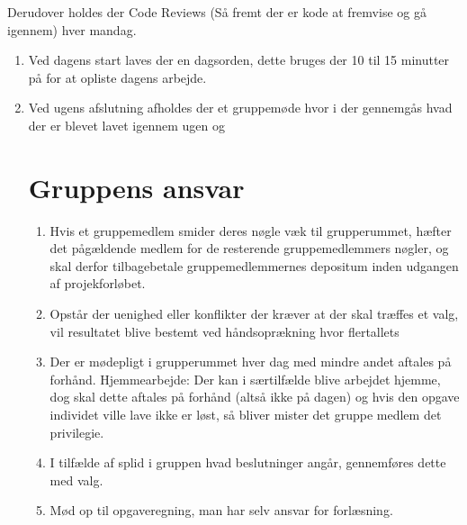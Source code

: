 Derudover holdes der Code Reviews (Så fremt der er kode at fremvise og gå igennem) hver mandag.

\begin{enumerate}
\item Ved dagens start laves der en dagsorden, dette bruges der 10 til 15 minutter på for at opliste dagens arbejde.
\item Ved ugens afslutning afholdes der et gruppemøde hvor i der gennemgås hvad der er blevet lavet igennem ugen og 

\section{Gruppens ansvar}
\begin{enumerate}
\item Hvis et gruppemedlem smider deres nøgle væk til grupperummet, hæfter det pågældende medlem for de resterende gruppemedlemmers nøgler, og skal derfor tilbagebetale gruppemedlemmernes depositum inden udgangen af projekforløbet.
\item Opstår der uenighed eller konflikter der kræver at der skal træffes et valg, vil resultatet blive bestemt ved håndsoprækning hvor flertallets
\begin{enumerate}

\end{enumerate}
\item Der er mødepligt i grupperummet hver dag med mindre andet aftales på forhånd.
Hjemmearbejde: Der kan i særtilfælde blive arbejdet hjemme, dog skal dette aftales på forhånd (altså ikke på dagen) og hvis den opgave individet ville lave ikke er løst, så bliver mister det gruppe medlem det privilegie.
\item I tilfælde af splid i gruppen hvad beslutninger angår, gennemføres dette med valg.
\item Mød op til opgaveregning, man har selv ansvar for forlæsning.
\end{enumerate}


\end{enumerate}
